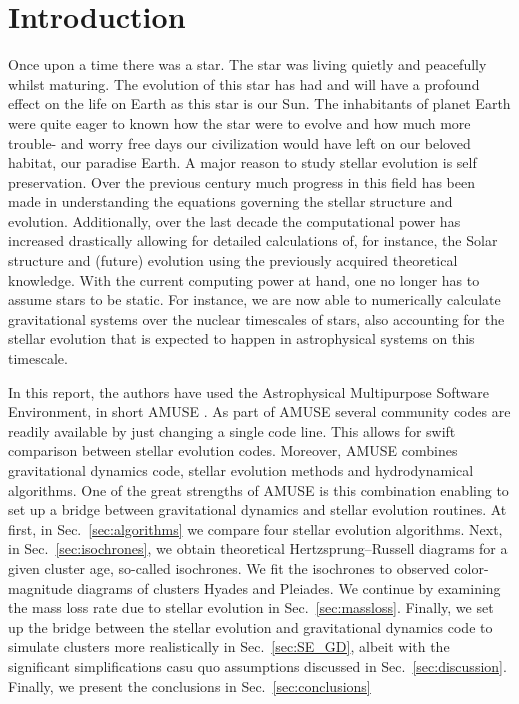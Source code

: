 \documentclass{aa}
\begin{document}
\section{Introduction}
Once upon a time there was a star. The star was living quietly and peacefully whilst maturing. The evolution of this star has had and will have a profound effect on the life on Earth as this star is our Sun. The inhabitants of planet Earth were quite eager to known how the star were to evolve and how much more trouble- and worry free days our civilization would have left on our beloved habitat, our paradise Earth. A major reason to study stellar evolution is self preservation. Over the previous century much progress in this field has been made in understanding the equations governing the stellar structure and evolution. Additionally, over the last decade the computational power has increased drastically allowing for detailed calculations of, for instance, the Solar structure and (future) evolution using the previously acquired theoretical knowledge. With the current computing power at hand, one no longer has to assume stars to be static. For instance, we are now able to numerically calculate gravitational systems over the nuclear timescales of stars, also accounting for the stellar evolution that is expected to happen in astrophysical systems on this timescale.

In this report, the authors have used the Astrophysical Multipurpose Software Environment, in short AMUSE \citep{2009NewA...14..369P, 2013CoPhC.183..456P, 2013A&A...557A..84P}. As part of AMUSE several community codes are readily available by just changing a single code line. This allows for swift comparison between stellar evolution codes. Moreover, AMUSE combines gravitational dynamics code, stellar evolution methods and hydrodynamical algorithms. One of the great strengths of AMUSE is this combination enabling to set up a bridge between gravitational dynamics and stellar evolution routines. At first, in Sec.~\ref{sec:algorithms} we compare four stellar evolution algorithms. Next, in Sec.~\ref{sec:isochrones}, we obtain theoretical Hertzsprung–Russell diagrams for a given cluster age, so-called isochrones. We fit the isochrones to observed color-magnitude diagrams of clusters Hyades and Pleiades. We continue by examining the mass loss rate due to stellar evolution in Sec.~\ref{sec:massloss}. Finally, we set up the bridge between the stellar evolution and gravitational dynamics code to simulate clusters more realistically in Sec.~\ref{sec:SE_GD}, albeit with the significant simplifications casu quo assumptions discussed in Sec.~\ref{sec:discussion}. Finally, we present the conclusions in Sec.~\ref{sec:conclusions}
\end{document}

